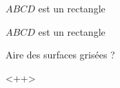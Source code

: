 
\begin{mental}

\( ABCD\) est un rectangle

\begin{center}                                                                                                                                                                                                                                                                                                                                                           
\end{center} 

\( ABCD\) est un rectangle

\begin{center}
   
\end{center}

    Aire des surfaces grisées ?

\end{mental}
<++>
